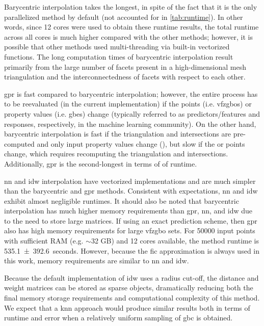 \documentclass[final,twocolumn,12pt]{elsarticle}
\begin{document}
Barycentric interpolation takes the longest, in spite of the fact that it is the only parallelized method by default (not accounted for in \cref{tab:runtime}). In other words, since 12 cores were used to obtain these runtime results, the total runtime across all cores is much higher compared with the other methods; however, it is possible that other methods used multi-threading via built-in vectorized functions. The long computation times of barycentric interpolation result primarily from the large number of facets present in a high-dimensional mesh triangulation and the interconnectedness of facets with respect to each other.

\Gls{gpr} is fast compared to barycentric interpolation; however, the entire process has to be reevaluated (in the current implementation) if the \inpt{} points (i.e. \glspl{vfzgbo}) or \inpt{} property values (i.e. \glspl{gbe}) change
(typically referred to as predictors/features and responses, respectively, in the machine learning community).
On the other hand, barycentric interpolation is fast if the triangulation and intersections are pre-computed and only input property values change (), but slow if the \inpt{} or \outpt{} points change, which requires recomputing the triangulation and intersections. Additionally, \gls{gpr} is the second-longest in terms of of runtime. %

\Gls{nn} and \gls{idw} interpolation have vectorized implementations and are much simpler than the barycentric and \gls{gpr} methods. Consistent with expectations, \gls{nn} and \gls{idw} exhibit almost negligible runtimes. %
It should also be noted that barycentric interpolation has much higher memory requirements than \gls{gpr}, \gls{nn}, and \gls{idw} due to the need to store large matrices. If using an exact prediction scheme, then \gls{gpr} also has high memory requirements for large \gls{vfzgbo} sets. For \num{50000} input points with sufficient RAM (e.g. $\sim$32 GB) and 12 cores available, the  method runtime is \SI{535.1 \pm 392.6}{seconds}. However, because the \gls{fic} approximation is always used in this work, memory requirements are similar to \gls{nn} and \gls{idw}.

Because the default implementation of \gls{idw} uses a radius cut-off, the distance and weight matrices can be stored as sparse objects, dramatically reducing both the final memory storage requirements and computational complexity of this method. We expect that a \gls{knn} approach would produce similar results both in terms of runtime and error when a relatively uniform sampling of \gls{gbc} is obtained.
\end{document}
